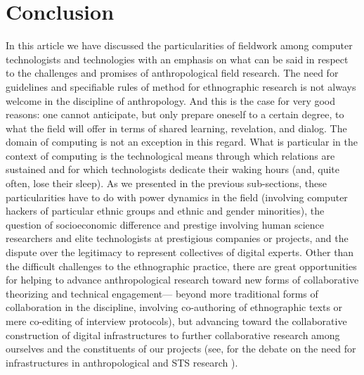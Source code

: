 \documentclass[10pt,letter,oneside]{scrartcl}
\begin{document}


\section*{Conclusion}

In this article we have discussed the particularities of fieldwork
among computer technologists and technologies with an emphasis on what
can be said in respect to the challenges and promises of anthropological
field research. The need for guidelines and specifiable rules of method for
ethnographic research is not always welcome in the discipline of
anthropology.   And this is the case for very good reasons: one cannot
anticipate, but only prepare oneself to a certain degree, to what the
field will offer in terms of shared learning, revelation, and
dialog. The domain of computing is not an exception in this regard. What is
particular in the context of computing is the technological means
through which relations are sustained and for which technologists
dedicate their waking hours (and, quite often, lose their sleep). As we
presented in the previous sub-sections, these particularities have to
do with power dynamics in the field (involving computer hackers of
particular ethnic groups and ethnic and gender minorities), the
question of socioeconomic difference and prestige involving human
science researchers and elite technologists at prestigious companies or projects, 
and the dispute over the legitimacy to represent collectives of digital experts. 
Other than the difficult challenges to the ethnographic practice, 
there are great opportunities for helping to advance anthropological research
toward new forms of collaborative theorizing and technical engagement---
beyond more traditional forms of collaboration in the discipline, 
involving co-authoring of ethnographic texts or mere co-editing of 
interview protocols), but advancing toward the collaborative 
construction of digital infrastructures to further collaborative 
research among ourselves and the constituents of our projects (see, for
the debate on the need for infrastructures in anthropological and
STS research \cite{Fortuns2015}).

%
%

\printbibliography
\end{document}
